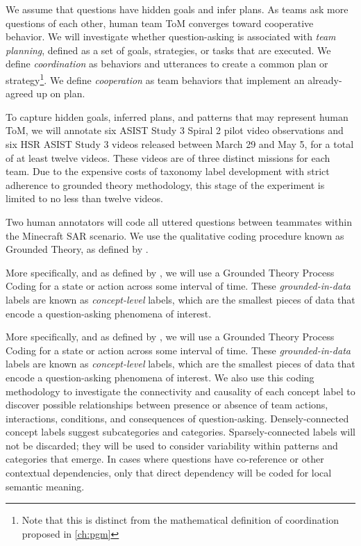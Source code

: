 We assume that questions have hidden goals and infer plans. As teams ask more
questions of each other, human team ToM converges toward cooperative behavior.
We will investigate whether question-asking is associated with \emph{team
planning}, defined as a set of goals, strategies, or tasks that are executed.
We define \emph{coordination} as behaviors and utterances to create a common
plan or strategy\footnote{Note that this is distinct from the mathematical
definition of coordination proposed in \autoref{ch:pgm}}. We define
\emph{cooperation} as team behaviors that implement an already-agreed up on
plan.

To capture hidden goals, inferred plans, and patterns that may represent human
ToM, we will annotate six ASIST Study 3 Spiral 2 pilot video observations and
six HSR ASIST Study 3 videos released between March 29 and May 5, for a total
of at least twelve videos. These videos are of three distinct missions for each
team. Due to the expensive costs of taxonomy label development with strict
adherence to grounded theory methodology, this stage of the experiment is
limited to no less than twelve videos. 

Two human annotators will code all uttered questions between teammates within the Minecraft SAR scenario.
We use the qualitative coding procedure known as Grounded Theory,
as defined by \citet{corbin_strauss_2015}. 

More specifically, and as defined by \citet{saldana_2021}, we will use a
Grounded Theory Process Coding for a state or action across some interval of
time. These \emph{grounded-in-data} labels are known as \emph{concept-level}
labels, which are the smallest pieces of data that encode a question-asking
phenomena of interest.

More specifically, and as defined by \citet{saldana_2021}, we will use a
Grounded Theory Process Coding for a state or action across some interval of
time. These \emph{grounded-in-data} labels are known as \emph{concept-level}
labels, which are the smallest pieces of data that encode a question-asking
phenomena of interest. We also use this coding methodology to investigate the connectivity and
causality of each concept label to discover possible relationships between
presence or absence of team actions, interactions, conditions, and consequences
of question-asking. Densely-connected concept labels suggest subcategories and
categories. Sparsely-connected labels will not be discarded; they will be used
to consider variability within patterns and categories that emerge. In cases
where questions have co-reference or other contextual dependencies, only that
direct dependency will be coded for local semantic meaning.

